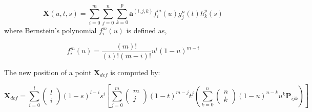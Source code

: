 \begin{equation}
\mathbf{X}(u, t, s)=\sum_{i=0}^{m} \sum_{j=0}^{n} \sum_{k=0}^{p} \mathbf{a}^{(i, j, k)} f_{i}^{m}(u) g_{j}^{n}(t) h_{k}^{p}(s)
\label{ffd_3d}
\end{equation}
where Bernstein's polynomial $f_{i}^{m}(u)$ is defined as,

\begin{equation}
f_{i}^{m}(u)=\frac{(m) !}{(i) !(m-i) !} u^{i}(1-u)^{m-i}
\label{bernstein_poly}
\end{equation}

The new position of a point $\textbf{X}_{def}$ is computed by:

\begin{equation*}
\mathbf{X}_{d e f}=\sum_{i=0}^{l}\left(\begin{array}{l}
l \\
i
\end{array}\right)(1-s)^{l-i} s^{i}\left[\sum_{j=0}^{m}\left(\begin{array}{c}
m \\
j
\end{array}\right)(1-t)^{m-j} t^{j}\left(\sum_{k=0}^{n}\left(\begin{array}{l}
n \\
k
\end{array}\right)(1-u)^{n-k} u^{k} \mathbf{P}_{i j k}\right)\right]\end{equation*}